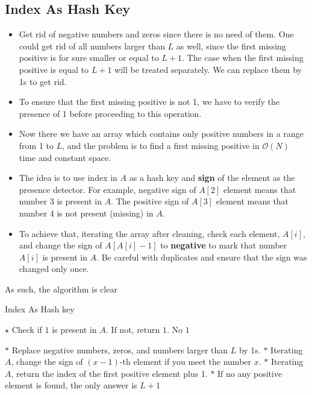 \subsection{Index As Hash Key}
\begin{itemize}
\item  Get rid of negative numbers and zeros since there is no need of them. One could get rid of all numbers larger than $L$ as well, since the first missing positive is for sure smaller or equal to $L + 1$. The case when the first missing positive is equal to $L + 1$ will be treated separately. We can replace them by 1s to get rid.
\item To ensure that the first missing positive is not 1, we have to verify the presence of 1 before proceeding to this operation.
\item Now there we have an array which contains only positive numbers in a range from 1 to $L$, and the problem is to find a first missing positive in $\mathcal{O}(N)$ time and constant space. 
\item The idea is to use index in $A$ as a hash key and \textbf{sign} of the element as the presence detector. For example, negative sign of $A[2]$ element means that number 3 is present in $A$. The positive sign of $A[3]$ element means that number 4 is not present (missing) in $A$.
\item To achieve that, iterating the array after cleaning, check each element, $A[i]$, and change the sign of $A[A[i]-1]$ to \textbf{negative} to mark that number $A[i]$ is present in $A$. Be careful with duplicates and ensure that the sign was changed only once.
\end{itemize}

As such, the algorithm is clear
\begin{algorithm}[H]
\caption{Index As Hash key}
\begin{algorithmic}[1]
\State $\star$ Check if $1$ is present in $A$. If not, return $1$.
\State {} \Comment No $1$
\EndIf
{}
\end{algorithmic}
\end{algorithm}
\begin{algorithm}[H]
\begin{algorithmic}[1]
\State $\ast$ Replace negative numbers, zeros, and numbers larger than $L$ by 1s.
\State $\ast$ Iterating $A$, change the sign of $(x-1)$-th element if you meet the number $x$. 
\State $\ast$ Iterating $A$, return the index of the first positive element plus 1.
\State $\ast$ If no any positive element is found, the only answer is $L+1$
\EndProcedure
\end{algorithmic}
\end{algorithm}

